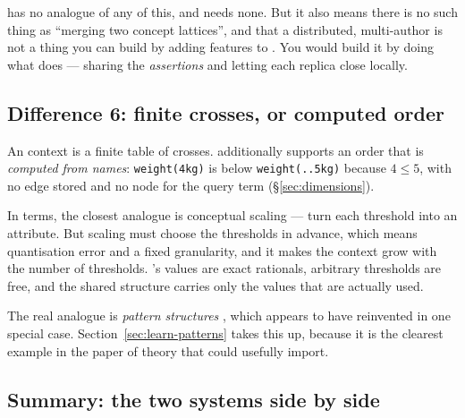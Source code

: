 \fca{} has no analogue of any of this, and needs none. But it also means
there is no such thing as ``merging two concept lattices'', and that a
distributed, multi-author \fca{} is not a thing you can build by adding
features to \fca{}. You would build it by doing what \odag{} does --- sharing
the \emph{assertions} and letting each replica close locally.

\subsection{Difference 6: finite crosses, or computed order}

An \fca{} context is a finite table of crosses. \odag{} additionally supports
an order that is \emph{computed from names}: \verb|weight(4kg)| is below
\verb|weight(..5kg)| because $4 \leq 5$, with no edge stored and no node for
the query term (\S\ref{sec:dimensions}).

In \fca{} terms, the closest analogue is conceptual scaling --- turn each
threshold into an attribute. But scaling must choose the thresholds in
advance, which means quantisation error and a fixed granularity, and it makes
the context grow with the number of thresholds. \odag{}'s values are exact
rationals, arbitrary thresholds are free, and the shared structure carries
only the values that are actually used.

The real \fca{} analogue is \emph{pattern structures}
\citep{ganter2001,kaytoue2011}, which \odag{} appears to have reinvented in
one special case. Section~\ref{sec:learn-patterns} takes this up, because it
is the clearest example in the paper of theory that \odag{} could usefully
import.

\subsection{Summary: the two systems side by side}
\label{sec:summary-of-differences}


